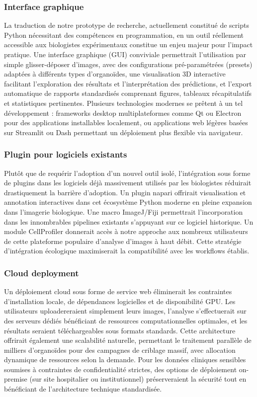 \subsubsection{Interface graphique}

La traduction de notre prototype de recherche, actuellement constitué de scripts Python nécessitant des compétences en programmation, en un outil réellement accessible aux biologistes expérimentaux constitue un enjeu majeur pour l'impact pratique. Une interface graphique (GUI) conviviale permettrait l'utilisation par simple glisser-déposer d'images, avec des configurations pré-paramétrées (presets) adaptées à différents types d'organoïdes, une visualisation 3D interactive facilitant l'exploration des résultats et l'interprétation des prédictions, et l'export automatique de rapports standardisés comprenant figures, tableaux récapitulatifs et statistiques pertinentes. Plusieurs technologies modernes se prêtent à un tel développement : frameworks desktop multiplateformes comme Qt ou Electron pour des applications installables localement, ou applications web légères basées sur Streamlit ou Dash permettant un déploiement plus flexible via navigateur.

\subsubsection{Plugin pour logiciels existants}

Plutôt que de requérir l'adoption d'un nouvel outil isolé, l'intégration sous forme de plugins dans les logiciels déjà massivement utilisés par les biologistes réduirait drastiquement la barrière d'adoption. Un plugin napari offrirait visualisation et annotation interactives dans cet écosystème Python moderne en pleine expansion dans l'imagerie biologique. Une macro ImageJ/Fiji permettrait l'incorporation dans les innombrables pipelines existants s'appuyant sur ce logiciel historique. Un module CellProfiler donnerait accès à notre approche aux nombreux utilisateurs de cette plateforme populaire d'analyse d'images à haut débit. Cette stratégie d'intégration écologique maximiserait la compatibilité avec les workflows établis.

\subsubsection{Cloud deployment}

Un déploiement cloud sous forme de service web éliminerait les contraintes d'installation locale, de dépendances logicielles et de disponibilité GPU. Les utilisateurs uploadereraient simplement leurs images, l'analyse s'effectuerait sur des serveurs dédiés bénéficiant de ressources computationnelles optimales, et les résultats seraient téléchargeables sous formats standards. Cette architecture offrirait également une scalabilité naturelle, permettant le traitement parallèle de milliers d'organoïdes pour des campagnes de criblage massif, avec allocation dynamique de ressources selon la demande. Pour les données cliniques sensibles soumises à contraintes de confidentialité strictes, des options de déploiement on-premise (sur site hospitalier ou institutionnel) préserveraient la sécurité tout en bénéficiant de l'architecture technique standardisée.


